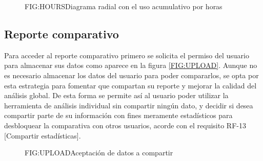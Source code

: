 \begin{figure}[]{FIG:HOURS}{Diagrama radial con el uso acumulativo por horas}
\end{figure}

\subsection{Reporte comparativo}

Para acceder al reporte comparativo primero se solicita el permiso del usuario para almacenar sus datos como aparece en la figura \ref{FIG:UPLOAD}. Aunque no es necesario almacenar los datos del usuario para poder compararlos, se opta por esta estrategia para fomentar que compartan su reporte y mejorar la calidad del análisis global. De esta forma se permite así al usuario poder utilizar la herramienta de análisis individual sin compartir ningún dato, y decidir si desea compartir parte de su información con fines meramente estadísticos para desbloquear la comparativa con otros usuarios, acorde con el requisito RF-13 [Compartir estadísticas].

\begin{figure}[]{FIG:UPLOAD}{Aceptación de datos a compartir}
\end{figure}

\newpage
